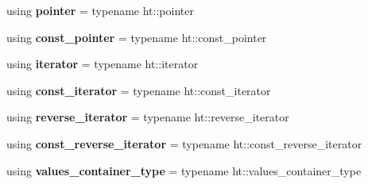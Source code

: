 \begin{DoxyCompactItemize}
\item 
\mbox{\label{classtsl_1_1ordered__map_a47c4eb1cf96a469fe6dd84f1b1532e60}} 
using {\bfseries pointer} = typename ht\+::pointer
\item 
\mbox{\label{classtsl_1_1ordered__map_a7e875a642a3edcfbf4509889d8dd39d3}} 
using {\bfseries const\+\_\+pointer} = typename ht\+::const\+\_\+pointer
\item 
\mbox{\label{classtsl_1_1ordered__map_af5648c7b681eaf8338d23803f4874a7f}} 
using {\bfseries iterator} = typename ht\+::iterator
\item 
\mbox{\label{classtsl_1_1ordered__map_abfaaac0f3ad0356f4acd87b8fc8dd745}} 
using {\bfseries const\+\_\+iterator} = typename ht\+::const\+\_\+iterator
\item 
\mbox{\label{classtsl_1_1ordered__map_a2b2b346f9c6631253092e51393da02e1}} 
using {\bfseries reverse\+\_\+iterator} = typename ht\+::reverse\+\_\+iterator
\item 
\mbox{\label{classtsl_1_1ordered__map_a2d62e5945a651a842ec352674c567cc3}} 
using {\bfseries const\+\_\+reverse\+\_\+iterator} = typename ht\+::const\+\_\+reverse\+\_\+iterator
\item 
\mbox{\label{classtsl_1_1ordered__map_a5063454dcaf9f1f9bb0cfcc4591bed37}} 
using {\bfseries values\+\_\+container\+\_\+type} = typename ht\+::values\+\_\+container\+\_\+type
\end{DoxyCompactItemize}
